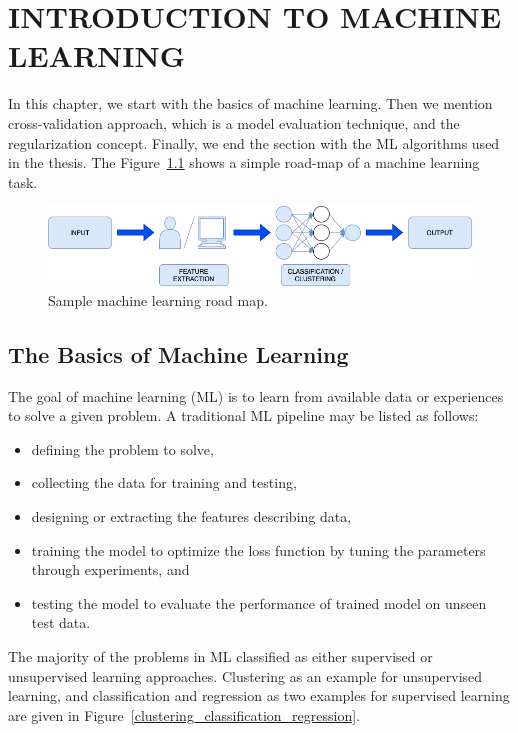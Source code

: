 \chapter{INTRODUCTION TO MACHINE LEARNING}
\label{ch:CH4}

In this chapter, we start with the basics of machine learning. Then we mention cross-validation approach, which is a model evaluation technique, and the regularization concept. Finally, we end the section with the ML algorithms used in the thesis. The Figure~\ref{basic_ml} shows a simple road-map of a machine learning task.

\begin{figure}[h]
	\centering
	\includegraphics[width=\linewidth]{fig/basic_ml.png}
	\vspace*{2mm}
	\caption{Sample machine learning road map.}
	\label{basic_ml}
\end{figure}

\section{The Basics of Machine Learning}

The goal of machine learning (ML) is to learn from available data or experiences to solve a given problem. A traditional ML pipeline may be listed as follows:

\begin{itemize}
    \item defining the problem to solve,
    \item collecting the data for training and testing,
    \item designing or extracting the features describing data,
    \item training the model to optimize the loss function by tuning the parameters through experiments, and
    \item testing the model to evaluate the performance of trained model on unseen test data.
\end{itemize}

The majority of the problems in ML classified as either supervised or unsupervised learning approaches. Clustering as an example for unsupervised learning, and classification and regression as two examples for supervised learning are given in Figure~\ref{clustering_classification_regression}.

